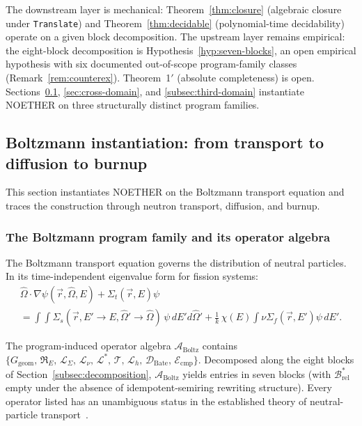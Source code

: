 \documentclass[acmsmall, screen]{acmart}
\begin{document}
\begin{tcolorbox}[colback=gray!5,colframe=black!50,arc=2pt,boxrule=0.5pt,fontupper=\small,title=Boundary of contribution (Section~\ref{sec:framework} restatement),fonttitle=\small\bfseries]
The downstream layer is mechanical: Theorem~\ref{thm:closure} (algebraic closure under \texttt{Translate}) and Theorem~\ref{thm:decidable} (polynomial-time decidability) operate on a given block decomposition. The upstream layer remains empirical: the eight-block decomposition is Hypothesis~\ref{hyp:seven-blocks}, an open empirical hypothesis with six documented out-of-scope program-family classes (Remark~\ref{rem:counterex}). Theorem~1$'$ (absolute completeness) is open. Sections~\ref{sec:reactor}, \ref{sec:cross-domain}, and \ref{subsec:third-domain} instantiate NOETHER on three structurally distinct program families.
\end{tcolorbox}

\subsection{Boltzmann instantiation: from transport to diffusion to burnup}
\label{sec:reactor}

This section instantiates NOETHER on the Boltzmann transport equation and traces the construction through neutron transport, diffusion, and burnup.

\subsubsection{The Boltzmann program family and its operator algebra}

The Boltzmann transport equation governs the distribution of neutral particles. In its time-independent eigenvalue form for fission systems:
\begin{multline}
\hat{\Omega}\!\cdot\!\nabla\psi(\vec{r},\hat{\Omega},E) + \Sigma_t(\vec{r},E)\psi \\
= \int\!\!\int \Sigma_s(\vec{r}, E'\!\to\!E,\hat{\Omega}'\!\to\!\hat{\Omega})\,\psi\,dE'd\hat{\Omega}'
+ \tfrac{1}{k}\,\chi(E)\!\!\int\!\nu\Sigma_f(\vec{r},E')\psi\,dE'.
\end{multline}

The program-induced operator algebra $\mathcal{A}_{\mathrm{Boltz}}$ contains $\{G_{\mathrm{geom}},\, \mathfrak{R}_E,\, \mathcal{L}_{\Sigma},\, \mathcal{L}_\nu,\, \mathcal{L}^*,\, \mathcal{T},\, \mathcal{L}_h,\, \mathcal{D}_{\mathrm{Bate}},\, \mathcal{E}_{\mathrm{cmp}}\}$. Decomposed along the eight blocks of Section~\ref{subsec:decomposition}, $\mathcal{A}_{\mathrm{Boltz}}$ yields entries in seven blocks (with $\mathcal{B}^{*}_{\mathrm{rel}}$ empty under the absence of idempotent-semiring rewriting structure). Every operator listed has an unambiguous status in the established theory of neutral-particle transport~\cite{BellGlasstone1970, LewisMiller1993}.
\end{document}
